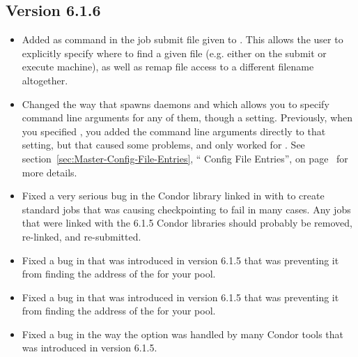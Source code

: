 \subsection{\label{sec:New-6-1-6}Version 6.1.6}

\begin{itemize}

\item Added  as command in the job submit file given to
.
This allows the user to explicitly specify where to find a given file (e.g.
either on the submit or execute machine), as well as remap file access to a
different filename altogether.

\item Changed the way that  spawns daemons and
 which allows you to specify command line arguments for
any of them, though a  setting.
Previously, when you specified , you added the command
line arguments directly to that setting, but that caused some
problems, and only worked for .
See section~\ref{sec:Master-Config-File-Entries}, ``
Config File Entries'', on
page~\pageref{sec:Master-Config-File-Entries} for more details.

\item Fixed a very serious bug in the Condor library linked in with
 to create standard jobs that was causing
checkpointing to fail in many cases.  
Any jobs that were linked with the 6.1.5 Condor libraries should
probably be removed, re-linked, and re-submitted. 

\item Fixed a bug in  that was introduced in version
6.1.5 that was preventing it from finding the address of the
 for your pool.

\item Fixed a bug in  that was introduced in version
6.1.5 that was preventing it from finding the address of the
 for your pool.

\item Fixed a bug in the way the  option was handled by
many Condor tools that was introduced in version 6.1.5. 



\end{itemize}
